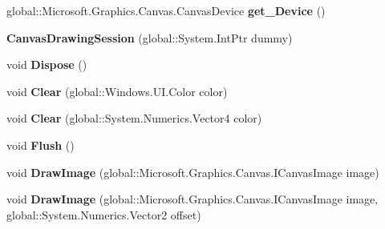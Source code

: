\begin{DoxyCompactItemize}
global\+::\+Microsoft.\+Graphics.\+Canvas.\+Canvas\+Device {\bfseries get\+\_\+\+Device} ()
\item 
\mbox{\label{class_microsoft_1_1_graphics_1_1_canvas_1_1_canvas_drawing_session_ab5926d0958db9bb95f10d9c1149f007b}} 
{\bfseries Canvas\+Drawing\+Session} (global\+::\+System.\+Int\+Ptr dummy)
\item 
\mbox{\label{class_microsoft_1_1_graphics_1_1_canvas_1_1_canvas_drawing_session_aa8795057edb6c38039ac437607c927b7}} 
void {\bfseries Dispose} ()
\item 
\mbox{\label{class_microsoft_1_1_graphics_1_1_canvas_1_1_canvas_drawing_session_ac5a71fe9735b4f08bc3895d80a30f11b}} 
void {\bfseries Clear} (global\+::\+Windows.\+U\+I.\+Color color)
\item 
\mbox{\label{class_microsoft_1_1_graphics_1_1_canvas_1_1_canvas_drawing_session_a0c1fe6c1a57f8b914956b26492229f33}} 
void {\bfseries Clear} (global\+::\+System.\+Numerics.\+Vector4 color)
\item 
\mbox{\label{class_microsoft_1_1_graphics_1_1_canvas_1_1_canvas_drawing_session_aa73abd2814515b3c01931aee8baf7995}} 
void {\bfseries Flush} ()
\item 
\mbox{\label{class_microsoft_1_1_graphics_1_1_canvas_1_1_canvas_drawing_session_acc7aeb2a0829a9f83508ee320cb32e17}} 
void {\bfseries Draw\+Image} (global\+::\+Microsoft.\+Graphics.\+Canvas.\+I\+Canvas\+Image image)
\item 
\mbox{\label{class_microsoft_1_1_graphics_1_1_canvas_1_1_canvas_drawing_session_a5ea40c57c8feef90c31ff91d3e136b95}} 
void {\bfseries Draw\+Image} (global\+::\+Microsoft.\+Graphics.\+Canvas.\+I\+Canvas\+Image image, global\+::\+System.\+Numerics.\+Vector2 offset)
\item 
\mbox{\label{class_microsoft_1_1_graphics_1_1_canvas_1_1_canvas_drawing_session_a8823e29fc6dd5003f7638c113c7cc318}} 

\end{DoxyCompactItemize}
